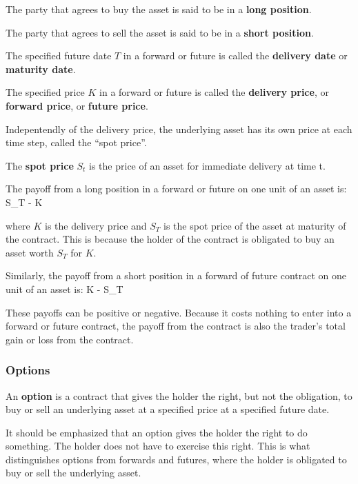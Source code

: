 The party that agrees to buy the asset is said to be in a \textbf{long position}.
\ed

The party that agrees to sell the asset is said to be in a \textbf{short position}.
\ed

The specified future date $T$ in a forward or future is called the \textbf{delivery date} or \textbf{maturity date}.
\ed

The specified price $K$ in a forward or future is called the \textbf{delivery price}, or \textbf{forward price}, or
\textbf{future price}.
\ed

Indepentendly of the delivery price, the underlying asset has its own price at each time step, called the ``spot
price''.

The \textbf{spot price} $S_t$ is the price of an asset for immediate delivery at time t.
\ed

The payoff from a long position in a forward or future on one unit of an asset is:
\bse
S_T - K
\ese

where $K$ is the delivery price and $S_T$ is the spot price of the asset at maturity of the contract. This is because
the holder of the contract is obligated to buy an asset worth $S_T$ for $K$.

Similarly, the payoff from a short position in a forward of future contract on one unit of an asset is:
\bse
K - S_T
\ese

These payoffs can be positive or negative. Because it costs nothing to enter into a forward or future contract, the
payoff from the contract is also the trader's total gain or loss from the contract.

\vspace{5pt}

\subsubsection{Options}

\bd[Option]
An \textbf{option} is a contract that gives the holder the right, but not the obligation, to buy or sell an underlying
asset at a specified price at a specified future date.
\ed

It should be emphasized that an option gives the holder the right to do something. The holder does not have to
exercise this right. This is what distinguishes options from forwards and futures, where the holder is obligated to
buy or sell the underlying asset.


